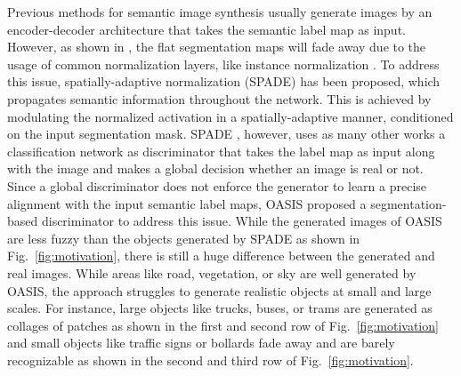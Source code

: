 \documentclass{bmvc2k}
\newcommand{\figref}[1]{Fig.~\ref{#1}}
\begin{document}
Previous methods for semantic image synthesis usually generate images by an encoder-decoder architecture that takes the semantic label map as input.
However, as shown in \cite{park2019semantic}, the flat segmentation maps will fade away due to the usage of common normalization layers, like instance normalization \cite{ulyanov2016instance}.
To address this issue, spatially-adaptive normalization (SPADE) \cite{park2019semantic} has been proposed, which propagates semantic information throughout the network.
This is achieved by modulating the normalized activation in a spatially-adaptive manner, conditioned on the input segmentation mask. SPADE \cite{park2019semantic}, however, uses as many other works a classification network as discriminator that takes the label map as input along with the image and makes a global decision whether an image is real or not. Since a global discriminator does not enforce the generator to learn a precise alignment with
the input semantic label maps, OASIS \cite{schonfeld_sushko_iclr2021,schonfeld_sushko_ijcv2022} proposed a segmentation-based discriminator to address this issue. 
While the generated images of OASIS are less fuzzy than the objects generated by SPADE as shown in \figref{fig:motivation}, there is still a huge difference between the generated and real images. While areas like road, vegetation, or sky are well generated by OASIS, the approach struggles to generate realistic objects at small and large scales. For instance, large objects like trucks, buses, or trams are generated as collages of patches as shown in the first and second row of \figref{fig:motivation} and small objects like traffic signs or bollards fade away and are barely recognizable as shown in the second and third row of \figref{fig:motivation}. 
\end{document}
